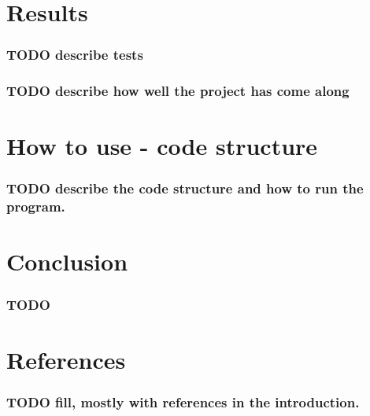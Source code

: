 \documentclass[a4paper]{article}
\begin{document}
\section{Results}
\label{sec:org9650fd0}
\subsubsection{{\bfseries\sffamily TODO} describe tests}
\label{sec:org09482d0}
\subsubsection{{\bfseries\sffamily TODO} describe how well the project has come along}
\label{sec:orgb3ad359}

\section{How to use - code structure}
\label{sec:org71376e1}
\subsubsection{{\bfseries\sffamily TODO} describe the code structure and how to run the program.}
\label{sec:org0d2e23f}
\section{Conclusion}
\label{sec:org08367fa}
\subsubsection{TODO}
\label{sec:org18cf01f}
\section{References}
\label{sec:org82cd50a}
\subsubsection{{\bfseries\sffamily TODO} fill, mostly with references in the introduction.}
\label{sec:orgd4a2b13}
\end{document}
